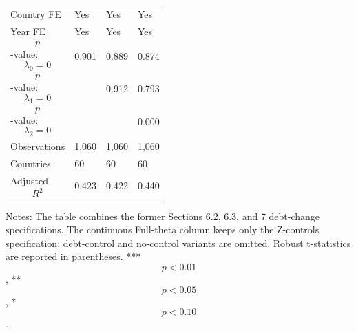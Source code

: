 \begin{table}[H]
\begin{threeparttable}
\begin{tabularx}{\textwidth}{lYYY}
Country FE & Yes & Yes & Yes \\
Year FE & Yes & Yes & Yes \\
$$p$$-value: $$\lambda_0=0$$ & 0.901 & 0.889 & 0.874 \\
$$p$$-value: $$\lambda_1=0$$ &  & 0.912 & 0.793 \\
$$p$$-value: $$\lambda_2=0$$ &  &  & 0.000 \\
Observations & 1,060 & 1,060 & 1,060 \\
Countries & 60 & 60 & 60 \\
Adjusted $$R^2$$ & 0.423 & 0.422 & 0.440 \\
\bottomrule
\end{tabularx}
\begin{tablenotes}[flushleft]\footnotesize
\item Notes: The table combines the former Sections 6.2, 6.3, and 7 debt-change specifications. The continuous Full-theta column keeps only the Z-controls specification; debt-control and no-control variants are omitted. Robust t-statistics are reported in parentheses. *** $$p<0.01$$, ** $$p<0.05$$, * $$p<0.10$$.
\end{tablenotes}
\end{threeparttable}
\end{table}
